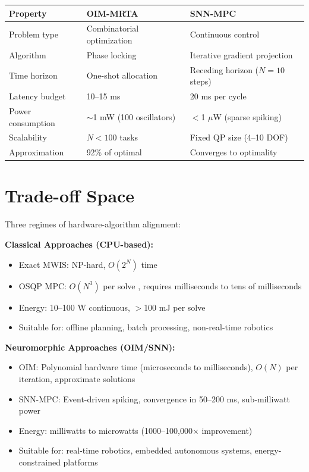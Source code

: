 \begin{center}
\begin{tabular}{lll}
\toprule
Property & OIM-MRTA & SNN-MPC \\ \midrule
Problem type & Combinatorial optimization & Continuous control \\
Algorithm & Phase locking \cite{Wang2019} & Iterative gradient projection \cite{He2016} \\
Time horizon & One-shot allocation & Receding horizon ($N=10$ steps) \\
Latency budget & 10--15 ms & 20 ms per cycle \\
Power consumption & $\sim$1 mW (100 oscillators) & $<$1 $\mu$W (sparse spiking) \\
Scalability & $N < 100$ tasks & Fixed QP size (4--10 DOF) \\
Approximation & 92\% of optimal & Converges to optimality \\
\bottomrule
\end{tabular}
\end{center}

\section{Trade-off Space}

Three regimes of hardware-algorithm alignment:

\textbf{Classical Approaches (CPU-based):}
\begin{itemize}
\item Exact MWIS: NP-hard, $O(2^N)$ time \cite{Korsah2012}
\item OSQP MPC: $O(N^3)$ per solve \cite{Stellato2018}, requires milliseconds to tens of milliseconds
\item Energy: 10--100 W continuous, $>$100 mJ per solve
\item Suitable for: offline planning, batch processing, non-real-time robotics
\end{itemize}

\textbf{Neuromorphic Approaches (OIM/SNN):}
\begin{itemize}
\item OIM: Polynomial hardware time (microseconds to milliseconds), $O(N)$ per iteration, approximate solutions \cite{Wang2019}
\item SNN-MPC: Event-driven spiking, convergence in 50--200 ms, sub-milliwatt power \cite{Mangalore2024}
\item Energy: milliwatts to microwatts (1000--100,000$\times$ improvement)
\item Suitable for: real-time robotics, embedded autonomous systems, energy-constrained platforms
\end{itemize}

